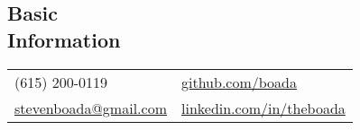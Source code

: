 \documentclass[margin,line, 11pt]{res}
\begin{document}

\begin{resume}
\vspace*{-2mm}
\section{Basic\\Information}
\begin{tabular}{@{}p{4.9in}p{4in}}
  (615) 200-0119 & \href{https://github.com/boada}{github.com/boada} \\
  \href{mailto:stevenboada@gmail.com}{stevenboada@gmail.com} & \href{https://linkedin.com/in/theboada}{linkedin.com/in/theboada} \\
\end{tabular}



\end{resume}
\end{document}
